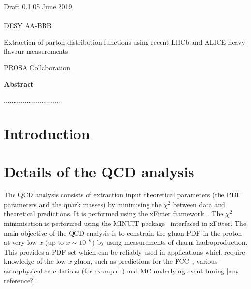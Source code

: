 \documentclass[12pt]{article}
\begin{document}
\begin{titlepage}
\noindent
Draft 0.1  \hfill 05 June 2019\\
\\
DESY AA-BBB %
\\

\vspace{1.3cm}

\begin{center}
  {\bf 

\large

Extraction of parton distribution functions using recent LHCb and ALICE heavy-flavour measurements
  }
  \vspace{1.5cm}

  {\large
    PROSA Collaboration
  }\\

  \vspace{1.2cm}

\end{center}
  \vspace{2.4cm}
\begin{center}
\large
{\bf Abstract}
\vspace{-0.2cm}
\end{center}
..............................
\vfill
\end{titlepage}


%
%
\newpage

\section{Introduction}
\label{sect:intro}

\section{Details of the QCD analysis}
\label{sec:qcdanalysis}
The QCD analysis consists of extraction input theoretical parameters (the PDF parameters and the quark masses) by minimising the $\chi^2$ between  data and theoretical predictions. 
It is performed using the xFitter framework~\cite{Alekhin:2014irh}. 
The $\chi^2$ minimisation is performed using the MINUIT package~\cite{James:1975dr} interfaced in xFitter.
The main objective of the QCD analysis is to constrain the gluon PDF in the proton at very low $x$ (up to $x \sim 10^{-6}$) by using measurements of charm hadroproduction. This provides a PDF set which can be reliably used in applications which require knowledge of the low-$x$ gluon, such as predictions for the FCC~\cite{Mangano:2016jyj}, various astrophysical calculations (for example~\cite{Garzelli:2015psa,Gauld:2015yia,Gauld:2015kvh,Garzelli:2016xmx,Bertone:2018dse}) and MC underlying event tuning [any reference?].
\end{document}
